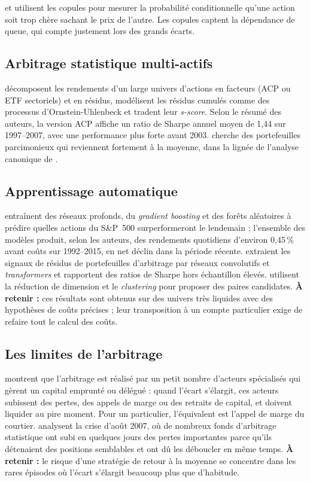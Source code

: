 \citet{liewwu2013} et \citet{xie2016} utilisent les copules pour mesurer la probabilité conditionnelle qu'une action soit \og trop chère\fg{} sachant le prix de l'autre. Les copules captent la dépendance de queue, qui compte justement lors des grands écarts.

\subsection{Arbitrage statistique multi-actifs}

\citet{avellaneda2010} décomposent les rendements d'un large univers d'actions en facteurs (ACP ou ETF sectoriels) et en résidus, modélisent les résidus cumulés comme des processus d'Ornstein-Uhlenbeck et tradent leur \emph{s-score}. Selon le résumé des auteurs, la version ACP affiche un ratio de Sharpe annuel moyen de 1,44 sur 1997–2007, avec une performance plus forte avant 2003. \citet{daspremont2011} cherche des portefeuilles parcimonieux qui reviennent fortement à la moyenne, dans la lignée de l'analyse canonique de \citet{boxtiao1977}.

\subsection{Apprentissage automatique}

\citet{krauss2017ml} entraînent des réseaux profonds, du \emph{gradient boosting} et des forêts aléatoires à prédire quelles actions du S\&P~500 surperformeront le lendemain ; l'ensemble des modèles produit, selon les auteurs, des rendements quotidiens d'environ 0,45\,\% avant coûts sur 1992–2015, en net déclin dans la période récente. \citet{guijarro2021} extraient les signaux de résidus de portefeuilles d'arbitrage par réseaux convolutifs et \emph{transformers} et rapportent des ratios de Sharpe hors échantillon élevés. \citet{sarmento2020} utilisent la réduction de dimension et le \emph{clustering} pour proposer des paires candidates. \textbf{À retenir :} ces résultats sont obtenus sur des univers très liquides avec des hypothèses de coûts précises ; leur transposition à un compte particulier exige de refaire tout le calcul des coûts.

\subsection{Les limites de l'arbitrage}

\citet{shleifer1997} montrent que l'arbitrage est réalisé par un petit nombre d'acteurs spécialisés qui gèrent un capital emprunté ou délégué : quand l'écart s'élargit, ces acteurs subissent des pertes, des appels de marge ou des retraits de capital, et doivent liquider au pire moment. Pour un particulier, l'équivalent est l'appel de marge du courtier. \citet{khandanilo2011} analysent la crise d'août 2007, où de nombreux fonds d'arbitrage statistique ont subi en quelques jours des pertes importantes parce qu'ils détenaient des positions semblables et ont dû les déboucler en même temps. \textbf{À retenir :} le risque d'une stratégie de retour à la moyenne se concentre dans les rares épisodes où l'écart s'élargit beaucoup plus que d'habitude.


